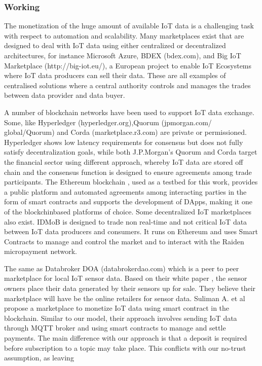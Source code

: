 \documentclass[12pt]{article}
\begin{document}
\subsubsection{Working}
The monetization of the huge amount of available IoT
data is a challenging task with respect to automation and
scalability. Many marketplaces exist that are designed to deal
with IoT data using either centralized or decentralized architectures, for instance Microsoft Azure, BDEX (bdex.com),
and Big IoT Marketplace (http://big-iot.eu/), a
European project to enable IoT Ecosystems where IoT data
producers can sell their data. These are all examples of
centralised solutions where a central authority controls and
manages the trades between data provider and data buyer.
\par
A number of blockchain networks have been used
to support IoT data exchange. Some, like Hyperledger (hyperledger.org),Quorum (jpmorgan.com/
global/Quorum) and Corda (marketplace.r3.com)
are private or permissioned. Hyperledger shows low latency
requirements for consensus but does not fully satisfy decentralization goals, while both J.P.Morgan’s Quorum and Corda
target the financial sector using different approach, whereby
IoT data are stored off chain and the consensus function
is designed to ensure agreements among trade participants.
The Ethereum blockchain , used as a testbed for this work,
provides a public platform and automated agreements among
interacting parties in the form of smart contracts and supports
the development of DApps, making it one of the blockchinbased platforms of choice.
Some decentralized IoT marketplaces also exist. IDMoB  is designed to trade non real-time and not critical
IoT data between IoT data producers and consumers. It runs
on Ethereum and uses Smart Contracts to manage and control
the market and to interact with the Raiden micropayment
network.
\par
The same as Databroker DOA (databrokerdao.com)
which is a peer to peer marketplace for local IoT sensor
data. Based on their white paper , the sensor owners
place their data generated by their sensors up for sale. They
believe their marketplace will have be the online retailers for
sensor data.
Suliman A. et al  propose a marketplace to monetize
IoT data using smart contract in the blockchain. Similar to
our model, their approach involves sending IoT data through
MQTT broker and using smart contracts to manage and settle
payments. The main difference with our approach is that a
deposit is required before subscription to a topic may take
place. This conflicts with our no-trust assumption, as leaving
\end{document}

